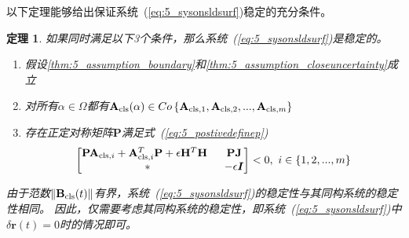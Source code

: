 \documentclass{article}
\newtheorem{theorem}{定理}
\begin{document}
以下定理能够给出保证系统~(\ref{eq:5_sysonsldsurf})稳定的充分条件。
\begin{theorem}
\label{thm:5_theorem_slidingstable}
如果同时满足以下3个条件，那么系统~(\ref{eq:5_sysonsldsurf})是稳定的。
\begin{enumerate}
    \item 假设\ref{thm:5_assumption_boundary}和\ref{thm:5_assumption_closeuncertainty}成立
    \item 对所有$\alpha \in \Omega$都有$\mathbf{A}_{\rm{cls}}(\alpha)\in Co\left\{\mathbf{A}_{{\rm{cls}},1},\mathbf{A}_{{\rm{cls}},2},...,\mathbf{A}_{{\rm{cls}},m}\right\}$
    \item 存在正定对称矩阵$\mathbf{P}$满足式~(\ref{eq:5_postivedefinep})
\begin{equation}
\begin{bmatrix}
 \mathbf{P} \mathbf{A}_{{\rm{cls}},i}+\mathbf{A}_{{\rm{cls}},i}^{T} \mathbf{P}+\epsilon \mathbf{H}^{T}\mathbf{H} \;\; & \mathbf{PJ} \\
 * & - \epsilon \bm{I}
\end{bmatrix}<0,\ i \in \{1,2,...,m\}
\label{eq:5_postivedefinep}
\end{equation}
\end{enumerate}
\proof
由于范数$\|\mathbf{B}_{\rm{cls}}(t)\|$有界，系统~(\ref{eq:5_sysonsldsurf})的稳定性与其同构系统的稳定性相同。
因此，仅需要考虑其同构系统的稳定性，即系统~(\ref{eq:5_sysonsldsurf})中$\delta \bm{r}(t)=0$时的情况即可。


\end{theorem}
\end{document}
